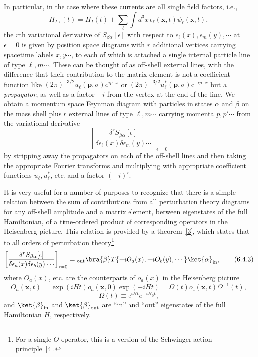 In particular, in the case where these currents are all single field factors,
i.e.,
\[
H_{I,\epsilon}(t)=H_I(t)+\sum_\ell\int d^3x\,
\epsilon_\ell(\mathbf x,t)\psi_\ell(\mathbf x,t),
\]
the $r$th variational derivative of $S_{\beta\alpha}[\epsilon]$ with respect to
$\epsilon_\ell(x),\epsilon_m(y),\cdots$ at $\epsilon=0$ is given by position
space diagrams with $r$ additional vertices carrying spacetime labels
$x,y\cdots$, to each of which is attached a single internal particle line of
type $\ell,m\cdots$. These can be thought of as off-shell external lines, with
the difference that their contribution to the matrix element is not a
coefficient function like $(2\pi)^{-3/2}u_\ell(\mathbf p,\sigma)e^{ip\cdot x}$
or $(2\pi)^{-3/2}u_\ell^*(\mathbf p,\sigma)e^{-ip\cdot x}$ but a
\textit{propagator}, as well as a factor $-i$ from the vertex at the end of the
line. We obtain a momentum space Feynman diagram with particles in states
$\alpha$ and $\beta$ on the mass shell plus $r$ external lines of type
$\ell,m\cdots$ carrying momenta $p,p'\cdots$ from the variational derivative
\[
\left[
\frac{\delta^rS_{\beta\alpha}[\epsilon]}
{\delta\epsilon_\ell(x)\delta\epsilon_m(y)\cdots}
\right]_{\epsilon=0}
\]
by stripping away the propagators on each of the off-shell lines and then
taking the appropriate Fourier transforms and multiplying with appropriate
coefficient functions $u_\ell,u_\ell^*$, etc. and a factor $(-i)^r$.

It is very useful for a number of purposes to recognize that there is a simple
relation between the sum of contributions from all perturbation theory
diagrams for any off-shell amplitude and a matrix element, between eigenstates
of the full Hamiltonian, of a time-ordered product of corresponding operators
in the Heisenberg picture. This relation is provided by a theorem~\hyperref[ref:6.3]{[3]}, which
states that to all orders of perturbation theory\footnote{For a single $O$
operator, this is a version of the Schwinger action principle~\hyperref[ref:6.4]{[4]}.}
\begin{equation}
\left[
\frac{\delta^rS_{\beta\alpha}[\epsilon]}
{\delta\epsilon_a(x)\delta\epsilon_b(y)\cdots}
\right]_{\epsilon=0}
={}_{\mathrm{out}}\bra{\beta}
T\{-iO_a(x),-iO_b(y),\cdots\}
\ket{\alpha}_{\mathrm{in}},
\tag{6.4.3}
\label{eq:6.4.3}
\end{equation}
where $O_a(x)$, etc. are the counterparts of $o_a(x)$ in the Heisenberg
picture
\begin{equation}
O_a(\mathbf x,t)=\exp(iHt)o_a(\mathbf x,0)\exp(-iHt)
=\Omega(t)o_a(\mathbf x,t)\Omega^{-1}(t),
\tag{6.4.4}
\label{eq:6.4.4}
\end{equation}
\begin{equation}
\Omega(t)\equiv e^{iHt}e^{-iH_0t},
\tag{6.4.5}
\label{eq:6.4.5}
\end{equation}
and $\ket{\beta}_{\mathrm{in}}$ and $\ket{\beta}_{\mathrm{out}}$ are ``in'' and
``out'' eigenstates of the full Hamiltonian $H$, respectively.

